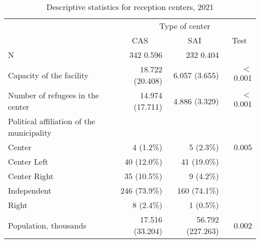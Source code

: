 

\begin{table}[ht]
\fontsize{8}{7.2}\selectfont
\renewcommand{\arraystretch}{1.6}
\caption{Descriptive statistics for reception centers, 2021}
\centering
\begin{tabular}{llll}
\cline{1-4}
\multicolumn{1}{r}{} &
  \multicolumn{3}{c}{Type of center} \\
\multicolumn{1}{r}{} &
  \multicolumn{1}{c}{CAS} &
  \multicolumn{1}{c}{SAI} &
  \multicolumn{1}{c}{Test} \\
\cline{1-4}
\multicolumn{1}{l}{N} &
  \multicolumn{1}{r}{342 0.596} &
  \multicolumn{1}{r}{232 0.404} &
  \multicolumn{1}{r}{} \\
\multicolumn{1}{l}{Capacity of the facility} &
  \multicolumn{1}{r}{18.722 (20.408)} &
  \multicolumn{1}{r}{6.057 (3.655)} &
  \multicolumn{1}{r}{$<$0.001} \\
\multicolumn{1}{l}{Number of refugees in the center} &
  \multicolumn{1}{r}{14.974 (17.711)} &
  \multicolumn{1}{r}{4.886 (3.329)} &
  \multicolumn{1}{r}{$<$0.001} \\
\multicolumn{1}{l}{Political affiliation of the municipality} &
  \multicolumn{1}{r}{} &
  \multicolumn{1}{r}{} &
  \multicolumn{1}{r}{} \\
\multicolumn{1}{l}{\hspace{1em}Center} &
  \multicolumn{1}{r}{4 (1.2\%)} &
  \multicolumn{1}{r}{5 (2.3\%)} &
  \multicolumn{1}{r}{0.005} \\
\multicolumn{1}{l}{\hspace{1em}Center Left} &
  \multicolumn{1}{r}{40 (12.0\%)} &
  \multicolumn{1}{r}{41 (19.0\%)} &
  \multicolumn{1}{r}{} \\
\multicolumn{1}{l}{\hspace{1em}Center Right} &
  \multicolumn{1}{r}{35 (10.5\%)} &
  \multicolumn{1}{r}{9 (4.2\%)} &
  \multicolumn{1}{r}{} \\
\multicolumn{1}{l}{\hspace{1em}Independent} &
  \multicolumn{1}{r}{246 (73.9\%)} &
  \multicolumn{1}{r}{160 (74.1\%)} &
  \multicolumn{1}{r}{} \\
\multicolumn{1}{l}{\hspace{1em}Right} &
  \multicolumn{1}{r}{8 (2.4\%)} &
  \multicolumn{1}{r}{1 (0.5\%)} &
  \multicolumn{1}{r}{} \\
\multicolumn{1}{l}{Population, thousands} &
  \multicolumn{1}{r}{17.516 (33.204)} &
  \multicolumn{1}{r}{56.792 (227.263)} &
  \multicolumn{1}{r}{0.002} \\

\end{tabular}
\end{table}
